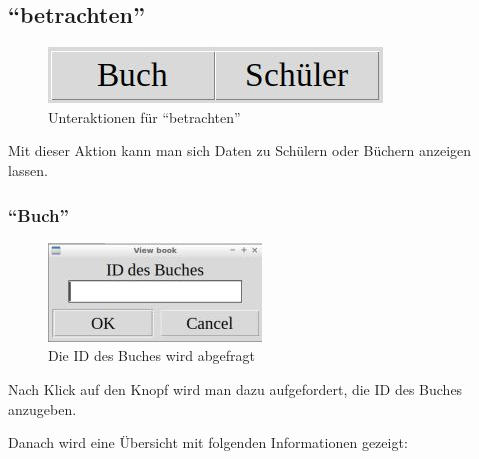 
\subsection{``betrachten''}
\label{subsec:detail:view}
\begin{figure}\includegraphics{images/gui2/view_menu.jpg}\caption{Unteraktionen für ``betrachten''}\label{fig:view_menu}\end{figure}

Mit dieser Aktion kann man sich Daten zu Schülern oder Büchern anzeigen lassen.

\subsubsection{``Buch''}
\label{subsubsec:detail:view:book}
\begin{figure}\includegraphics{images/gui2/view_book_ask.jpg}\caption{Die ID des Buches wird abgefragt}\label{fig:view_book_ask}\end{figure}

Nach Klick auf den Knopf wird man dazu aufgefordert, die ID des Buches anzugeben.

Danach wird eine Übersicht mit folgenden Informationen gezeigt:

